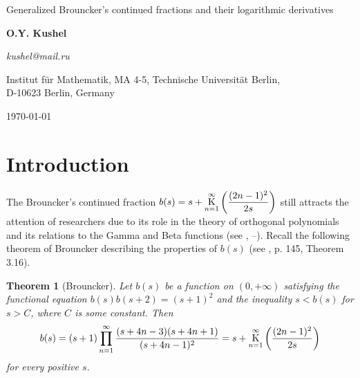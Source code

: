 \documentclass[a4paper,10pt]{article}      %
\newcommand{\K}{\operatornamewithlimits{K}}
\newtheorem{theorem}{Theorem}[section]
\begin{document}
\begin{center}
{\huge {Generalized Brouncker's continued fractions and their logarithmic derivatives}} \\[0.5cm]
\end{center}

\begin{center}
    {\bf  O.Y. Kushel}
\end{center}
\begin{center}
  {\it  kushel@mail.ru}
\end{center}
\begin{center}
    Institut f\"{u}r Mathematik, MA 4-5, Technische Universit\"{a}t Berlin, \\ D-10623 Berlin, Germany
\end{center}
\begin{center}
\today
\end{center}

\begin{abstract}
In this paper, we study the continued fraction $y(s,r)$ which satisfies the equation $y(s,r)y(s+2r,r)=(s+1)(s+2r-1)$ for $r > \dfrac{1}{2}$. This continued fraction is a generalization of the Brouncker's continued fraction $b(s)$. We extend the formulas for the first and the second logarithmic derivatives of $b(s)$ to the case of $y(s,r)$. The asymptotic series for $y(s,r)$ at $\infty$ are also studied. The generalizations of some Ramanujan's formulas are presented.

{\bf Keywords}: Brouncker's continued fraction, Ramanujan's formula, Asymptotic series, Functional equations.
Primary 11A55 Secondary 11J70, 30B70.
\end{abstract}

\section{Introduction}
\label{intro}

The Brouncker's continued fraction $b(s) = s+ \K \limits_{n=1}^{\infty}\left(\dfrac{(2n-1)^2}{2s}\right)$ still attracts the attention of researchers due to its role in the theory of orthogonal polynomials and its relations to the Gamma and Beta functions (see \cite{DUT}, \cite{KHRB}--\cite{KHR2}). Recall the following theorem of Brouncker describing the properties of $b(s)$ (see \cite{KHRB}, p. 145, Theorem 3.16).

\begin{theorem}[Brouncker]
 Let $b(s)$ be a function on $(0, + \infty)$ satisfying the functional equation $b(s)b(s+2) = (s+1)^2$ and the inequality $s < b(s)$ for $s > C$, where $C$ is some constant. Then $$b(s)
  = (s+1) \prod_{n=1}^{\infty}\dfrac{(s+4n - 3)(s+4n + 1)}{(s+ 4n - 1)^2}  =
  s +  \K_{n=1}^\infty\left(\dfrac{(2n-1)^2}{2s}\right)$$
for every positive $s$.
\end{theorem}
\end{document}
